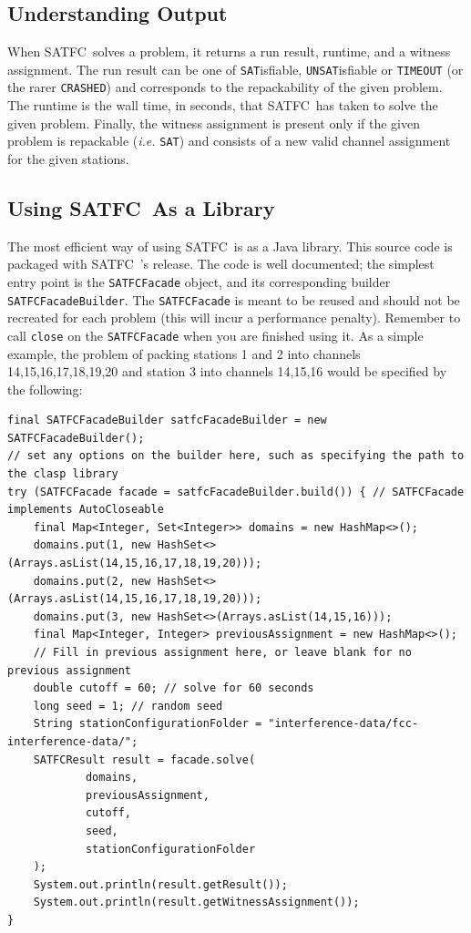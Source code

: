 \documentclass[
10pt, %
letterpaper, %
oneside, %
headinclude,footinclude, %
BCOR5mm, %
needspace, %
]{scrartcl}
\newcommand{\SATFC}{\textsc{SATFC}~}
\begin{document}
\subsection{Understanding Output}
When \SATFC solves a problem, it returns a run result, runtime, and a witness assignment. The run result can be one of \texttt{SAT}isfiable, \texttt{UNSAT}isfiable or \texttt{TIMEOUT} (or the rarer \texttt{CRASHED}) and corresponds to the repackability of the given problem. The runtime is the wall time, in seconds, that \SATFC has taken to solve the given problem. Finally, the witness assignment is present only if the given problem is repackable (\emph{i.e.} \texttt{SAT}) and consists of a new valid channel assignment for the given stations.

\subsection{Using \SATFC As a Library}

The most efficient way of using \SATFC is as a Java library. This source code is packaged with \SATFC's release. The code is well documented; the simplest entry point is the \texttt{SATFCFacade} object, and its corresponding builder \texttt{SATFCFacadeBuilder}. The \texttt{SATFCFacade} is meant to be reused and should not be recreated for each problem (this will incur a performance penalty). Remember to call \texttt{close} on the \texttt{SATFCFacade} when you are finished using it. As a simple example, the problem of packing stations 1 and 2 into channels 14,15,16,17,18,19,20 and station 3 into channels 14,15,16 would be specified by the following:

\begin{verbatim}
final SATFCFacadeBuilder satfcFacadeBuilder = new SATFCFacadeBuilder();
// set any options on the builder here, such as specifying the path to the clasp library
try (SATFCFacade facade = satfcFacadeBuilder.build()) { // SATFCFacade implements AutoCloseable
    final Map<Integer, Set<Integer>> domains = new HashMap<>();
    domains.put(1, new HashSet<>(Arrays.asList(14,15,16,17,18,19,20)));
    domains.put(2, new HashSet<>(Arrays.asList(14,15,16,17,18,19,20)));
    domains.put(3, new HashSet<>(Arrays.asList(14,15,16)));
    final Map<Integer, Integer> previousAssignment = new HashMap<>();
    // Fill in previous assignment here, or leave blank for no previous assignment
    double cutoff = 60; // solve for 60 seconds
    long seed = 1; // random seed
    String stationConfigurationFolder = "interference-data/fcc-interference-data/";
    SATFCResult result = facade.solve(
            domains,
            previousAssignment,
            cutoff,
            seed,
            stationConfigurationFolder
    );
    System.out.println(result.getResult());
    System.out.println(result.getWitnessAssignment());
}
\end{verbatim}
\end{document}
